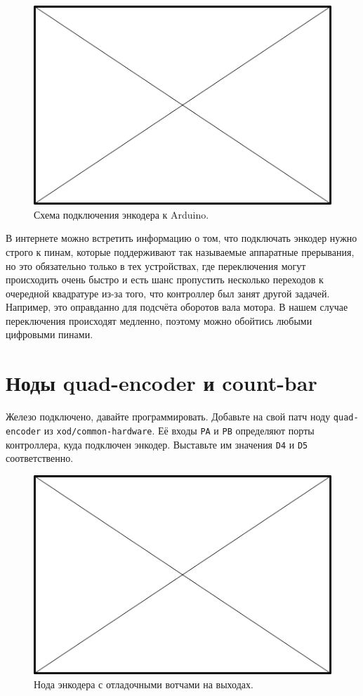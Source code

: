 \begin{figure}
  \centering
  \includegraphics{TODO.png}
  \caption{Схема подключения энкодера к Arduino.}
  \label{encoder-wiring}
\end{figure}

В интернете можно встретить информацию о том, что подключать энкодер нужно строго к пинам, которые поддерживают так называемые аппаратные прерывания, но это обязательно только в тех устройствах, где переключения могут происходить очень быстро и есть шанс пропустить несколько переходов к очередной квадратуре из-за того, что контроллер был занят другой задачей. Например, это оправданно для подсчёта оборотов вала мотора. В нашем случае переключения происходят медленно, поэтому можно обойтись любыми цифровыми пинами.

\section{Ноды quad-encoder и count-bar}

Железо подключено, давайте программировать. Добавьте на свой патч ноду \texttt{quad-encoder} из \texttt{xod/common-hardware}. Её входы \texttt{PA} и \texttt{PB} определяют порты контроллера, куда подключен энкодер. Выставьте им значения \texttt{D4} и \texttt{D5} соответственно.

\begin{figure}
  \centering
  \includegraphics{TODO.png}
  \caption{Нода энкодера с отладочными вотчами на выходах.}
\end{figure}

